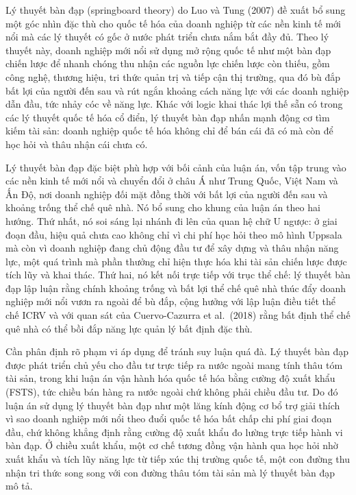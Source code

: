 \documentclass[
  a4paper,
  13pt]{extreport}
\begin{document}
Lý thuyết bàn đạp (springboard theory) do Luo và Tung (2007) đề xuất bổ
sung một góc nhìn đặc thù cho quốc tế hóa của doanh nghiệp từ các nền
kinh tế mới nổi mà các lý thuyết có gốc ở nước phát triển chưa nắm bắt
đầy đủ. Theo lý thuyết này, doanh nghiệp mới nổi sử dụng mở rộng quốc tế
như một bàn đạp chiến lược để nhanh chóng thu nhận các nguồn lực chiến
lược còn thiếu, gồm công nghệ, thương hiệu, tri thức quản trị và tiếp
cận thị trường, qua đó bù đắp bất lợi của người đến sau và rút ngắn
khoảng cách năng lực với các doanh nghiệp dẫn đầu, tức nhảy cóc về năng
lực. Khác với logic khai thác lợi thế sẵn có trong các lý thuyết quốc tế
hóa cổ điển, lý thuyết bàn đạp nhấn mạnh động cơ tìm kiếm tài sản: doanh
nghiệp quốc tế hóa không chỉ để bán cái đã có mà còn để học hỏi và thâu
nhận cái chưa có.

Lý thuyết bàn đạp đặc biệt phù hợp với bối cảnh của luận án, vốn tập
trung vào các nền kinh tế mới nổi và chuyển đổi ở châu Á như Trung Quốc,
Việt Nam và Ấn Độ, nơi doanh nghiệp đối mặt đồng thời với bất lợi của
người đến sau và khoảng trống thể chế quê nhà. Nó bổ sung cho khung của
luận án theo hai hướng. Thứ nhất, nó soi sáng lại nhánh đi lên của quan
hệ chữ U ngược: ở giai đoạn đầu, hiệu quả chưa cao không chỉ vì chi phí
học hỏi theo mô hình Uppsala mà còn vì doanh nghiệp đang chủ động đầu tư
để xây dựng và thâu nhận năng lực, một quá trình mà phần thưởng chỉ hiện
thực hóa khi tài sản chiến lược được tích lũy và khai thác. Thứ hai, nó
kết nối trực tiếp với trục thể chế: lý thuyết bàn đạp lập luận rằng
chính khoảng trống và bất lợi thể chế quê nhà thúc đẩy doanh nghiệp mới
nổi vươn ra ngoài để bù đắp, cộng hưởng với lập luận điều tiết thể chế
ICRV và với quan sát của Cuervo-Cazurra et al.~(2018) rằng bất định thể
chế quê nhà có thể bồi đắp năng lực quản lý bất định đặc thù.

Cần phân định rõ phạm vi áp dụng để tránh suy luận quá đà. Lý thuyết bàn
đạp được phát triển chủ yếu cho đầu tư trực tiếp ra nước ngoài mang tính
thâu tóm tài sản, trong khi luận án vận hành hóa quốc tế hóa bằng cường
độ xuất khẩu (FSTS), tức chiều bán hàng ra nước ngoài chứ không phải
chiều đầu tư. Do đó luận án sử dụng lý thuyết bàn đạp như một lăng kính
động cơ bổ trợ giải thích vì sao doanh nghiệp mới nổi theo đuổi quốc tế
hóa bất chấp chi phí giai đoạn đầu, chứ không khẳng định rằng cường độ
xuất khẩu đo lường trực tiếp hành vi bàn đạp. Ở chiều xuất khẩu, một cơ
chế tương đồng vận hành qua học hỏi nhờ xuất khẩu và tích lũy năng lực
từ tiếp xúc thị trường quốc tế, một con đường thu nhận tri thức song
song với con đường thâu tóm tài sản mà lý thuyết bàn đạp mô tả.
\end{document}
